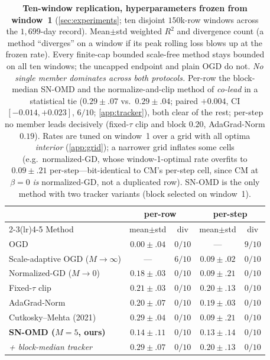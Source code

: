 \documentclass{article}
\begin{document}
\begin{table}[t]
\caption{\textbf{Ten-window replication, hyperparameters frozen from window~1}
(\cref{sec:experiments}; ten disjoint $150$k-row windows across the $1{,}699$-day record).
Mean$\pm$std weighted $R^2$ and divergence count (a method ``diverges'' on a window if its
peak rolling loss blows up at the frozen rate). Every finite-cap bounded scale-free method
stays bounded on all ten windows; the uncapped endpoint and plain OGD do not. \emph{No single
member dominates across both protocols.} Per-row the block-median SN-OMD and the
normalize-and-clip method of \citet{cutkoskymehta2021} \emph{co-lead} in a statistical tie
($0.29\!\pm\!.07$ vs.\ $0.29\!\pm\!.04$; paired $+0.004$, CI $[-0.014,+0.023]$, $6/10$;
\cref{app:tracker}), both clear of the rest; per-step no member leads decisively (fixed-$\tau$
clip and block $0.20$, AdaGrad-Norm $0.19$). Rates are tuned on window~1 over a grid with all
optima \emph{interior} (\cref{app:grid}); a narrower grid inflates some cells (e.g.\
normalized-GD, whose window-1-optimal rate overfits to $0.09\!\pm\!.21$ per-step---bit-identical
to CM's per-step cell, since CM at $\beta{=}0$ \emph{is} normalized-GD, not a duplicated row).
SN-OMD is the only method with two tracker variants (block selected on window~1).}
\label{tab:replication}
\centering
\begin{small}
\setlength{\tabcolsep}{3.5pt}
\begin{tabular}{lcccc}
\toprule
 & \multicolumn{2}{c}{per-row} & \multicolumn{2}{c}{per-step} \\
\cmidrule(lr){2-3}\cmidrule(lr){4-5}
Method & mean$\pm$std & div & mean$\pm$std & div \\
\midrule
OGD                                    & $0.00\pm.04$ & $0/10$ & --- & $9/10$ \\
Scale-adaptive OGD ($M\!\to\!\infty$)  & --- & $6/10$ & $0.09\pm.02$ & $0/10$ \\
Normalized-GD ($M\!\to\!0$)            & $0.18\pm.03$ & $0/10$ & $0.09\pm.21$ & $0/10$ \\
Fixed-$\tau$ clip                      & $0.21\pm.03$ & $0/10$ & $\mathbf{0.20}\pm.13$ & $0/10$ \\
AdaGrad-Norm                           & $0.20\pm.07$ & $0/10$ & $0.19\pm.03$ & $0/10$ \\
Cutkosky--Mehta (2021)                 & $\mathbf{0.29}\pm.04$ & $0/10$ & $0.09\pm.21$ & $0/10$ \\
\textbf{SN-OMD ($M{=}5$, ours)}        & $0.14\pm.11$ & $0/10$ & $0.13\pm.14$ & $0/10$ \\
\quad\emph{+ block-median tracker}     & $\mathbf{0.29}\pm.07$ & $0/10$ & $\mathbf{0.20}\pm.13$ & $0/10$ \\
\bottomrule
\end{tabular}
\end{small}
\end{table}
\end{document}
